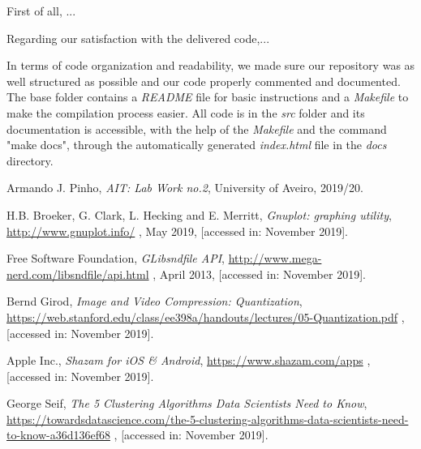 \documentclass[12pt]{article}
\begin{document}
First of all, ...

Regarding our satisfaction with the delivered code,...

In terms of code organization and readability, we made sure our 
repository was as well structured as possible and our code properly commented
and documented.
The base folder contains a {\it README\/} file for basic instructions and a 
{\it Makefile\/} to make the compilation process easier.
All code is in the {\it src\/} folder and its documentation is accessible, 
with the help of the {\it Makefile\/} and the command "make docs", through
the automatically generated {\it index.html\/} file in the {\it docs\/} 
directory.

\begin{thebibliography}{9}
  

    Armando J. Pinho,
    \textit{AIT: Lab Work no.2},
    University of Aveiro,
    2019/20.
  
    H.B. Broeker, G. Clark, L. Hecking and E. Merritt,
    \textit{Gnuplot: graphing utility},
    \url{http://www.gnuplot.info/} ,
    May 2019,
    [accessed in: November 2019].

    Free Software Foundation,
    \textit{GLibsndfile API},
    \url{http://www.mega-nerd.com/libsndfile/api.html} ,
    April 2013,
    [accessed in: November 2019].

    Bernd Girod,
    \textit{Image and Video Compression: Quantization},
    \url{https://web.stanford.edu/class/ee398a/handouts/lectures/05-Quantization.pdf} ,
    [accessed in: November 2019].

    Apple Inc.,
    \textit{Shazam for iOS \& Android},
    \url{https://www.shazam.com/apps} ,
    [accessed in: November 2019].

    George Seif,
    \textit{The 5 Clustering Algorithms Data Scientists Need to Know},
    \url{https://towardsdatascience.com/the-5-clustering-algorithms-data-scientists-need-to-know-a36d136ef68} ,
    [accessed in: November 2019].

\end{thebibliography}

\clearpage
\end{document}
